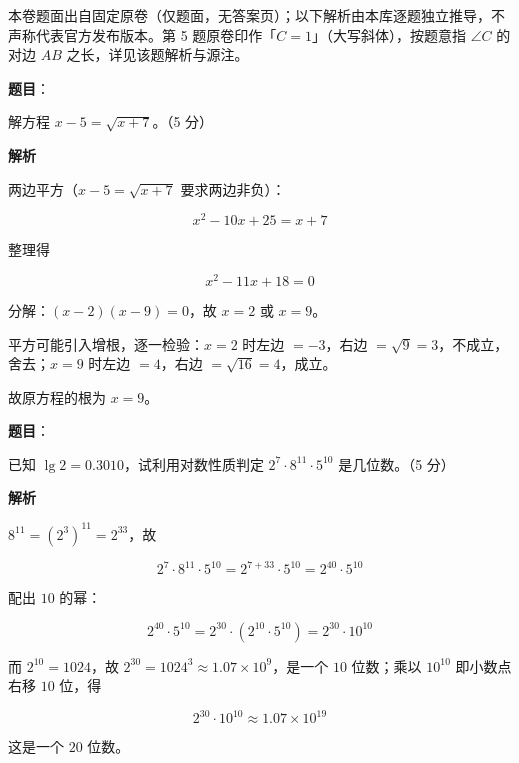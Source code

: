 

\begin{gktip}
本卷题面出自固定原卷（仅题面，无答案页）；以下解析由本库逐题独立推导，不声称代表官方发布版本。第 5 题原卷印作「$C=1$」（大写斜体），按题意指 $\angle C$ 的对边 $AB$ 之长，详见该题解析与源注。
\end{gktip}


\begin{answer}

\textbf{题目}：

解方程 $x-5=\sqrt{x+7}$。（5 分）

\textbf{解析}

两边平方（$x-5=\sqrt{x+7}$ 要求两边非负）：

\nopagebreak[4]
\[
x^{2}-10x+25=x+7
\]

整理得

\nopagebreak[4]
\[
x^{2}-11x+18=0
\]

分解：$(x-2)(x-9)=0$，故 $x=2$ 或 $x=9$。

平方可能引入增根，逐一检验：$x=2$ 时左边 $=-3$，右边 $=\sqrt{9}=3$，不成立，舍去；$x=9$ 时左边 $=4$，右边 $=\sqrt{16}=4$，成立。

故原方程的根为 $x=9$。


\end{answer}
\begin{answer}

\textbf{题目}：

已知 $\lg 2=0.3010$，试利用对数性质判定 $2^{7}\cdot 8^{11}\cdot 5^{10}$ 是几位数。（5 分）

\textbf{解析}

$8^{11}=(2^{3})^{11}=2^{33}$，故

\nopagebreak[4]
\[
2^{7}\cdot 8^{11}\cdot 5^{10}=2^{7+33}\cdot 5^{10}=2^{40}\cdot 5^{10}
\]

配出 $10$ 的幂：

\nopagebreak[4]
\[
2^{40}\cdot 5^{10}=2^{30}\cdot(2^{10}\cdot 5^{10})=2^{30}\cdot 10^{10}
\]

而 $2^{10}=1024$，故 $2^{30}=1024^{3}\approx 1.07\times 10^{9}$，是一个 $10$ 位数；乘以 $10^{10}$ 即小数点右移 $10$ 位，得

\nopagebreak[4]
\[
2^{30}\cdot 10^{10}\approx 1.07\times 10^{19}
\]

这是一个 $20$ 位数。


\end{answer}
